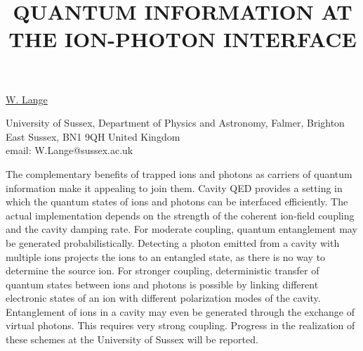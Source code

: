 \title{QUANTUM INFORMATION AT THE ION-PHOTON INTERFACE}

\underline{W. Lange}


University of Sussex,
Department of Physics and Astronomy,
Falmer, Brighton
East Sussex, BN1 9QH
United Kingdom\\
email: W.Lange@sussex.ac.uk

The complementary benefits of trapped ions and photons as carriers of
quantum information make it appealing to join them. Cavity QED provides
a setting in which the quantum states of ions and photons can be
interfaced efficiently. The actual implementation depends on the
strength of the coherent ion-field coupling and the cavity damping rate.
For moderate coupling, quantum entanglement may be generated
probabilistically. Detecting a photon emitted from a cavity with
multiple ions projects the ions to an entangled state, as there is no
way to determine the source ion. For stronger coupling, deterministic
transfer of quantum states between ions and photons is possible by
linking different electronic states of an ion with different
polarization modes of the cavity. Entanglement of ions in a cavity may
even be generated through the exchange of virtual photons. This requires
very strong coupling. Progress in the realization of these schemes at
the University of Sussex will be reported.

\vspace{\baselineskip}